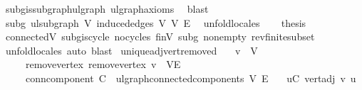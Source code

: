 \begin{isabellebody}
\ subg{\isachardot}{\kern0pt}is{\isacharunderscore}{\kern0pt}subgraph{\isacharunderscore}{\kern0pt}ulgraph\ ulgraph{\isacharunderscore}{\kern0pt}axioms\ \isamarkupfalse%
\ blast\isanewline
\ \ \isamarkupfalse%
\ subg{\isacharcolon}{\kern0pt}\ ulsubgraph\ V{\isacharprime}{\kern0pt}\ {\isachardoublequoteopen}induced{\isacharunderscore}{\kern0pt}edges\ V{\isacharprime}{\kern0pt}{\isachardoublequoteclose}\ V\ E\ \isamarkupfalse%
\ unfold{\isacharunderscore}{\kern0pt}locales\isanewline
\ \ \isamarkupfalse%
\ {\isacharquery}{\kern0pt}thesis\ \isamarkupfalse%
\ connected{\isacharunderscore}{\kern0pt}V{\isacharprime}{\kern0pt}\ subg{\isachardot}{\kern0pt}is{\isacharunderscore}{\kern0pt}cycle{}\ no{\isacharunderscore}{\kern0pt}cycles\ finV\ subg\ non{\isacharunderscore}{\kern0pt}empty\ rev{\isacharunderscore}{\kern0pt}finite{\isacharunderscore}{\kern0pt}subset\ \isamarkupfalse%
\ {\isacharparenleft}{\kern0pt}unfold{\isacharunderscore}{\kern0pt}locales{\isacharparenright}{\kern0pt}\ {\isacharparenleft}{\kern0pt}auto{\isacharcomma}{\kern0pt}\ blast{\isacharparenright}{\kern0pt}\isanewline
{}\isamarkupfalse%
%
\endisatagproof
{\isafoldproof}%
%
\isadelimproof
\isanewline
%
\endisadelimproof
\isanewline
{}\isamarkupfalse%
\ unique{\isacharunderscore}{\kern0pt}adj{\isacharunderscore}{\kern0pt}vert{\isacharunderscore}{\kern0pt}removed{\isacharcolon}{\kern0pt}\isanewline
\ \ \ {\isachardoublequoteopen}v\ {\isasymin}\ V{\isachardoublequoteclose}\isanewline
\ \ \ \ \ remove{\isacharunderscore}{\kern0pt}vertex{\isacharcolon}{\kern0pt}\ {\isachardoublequoteopen}remove{\isacharunderscore}{\kern0pt}vertex\ v\ {\isacharequal}{\kern0pt}\ {\isacharparenleft}{\kern0pt}V{\isacharprime}{\kern0pt}{\isacharcomma}{\kern0pt}E{\isacharprime}{\kern0pt}{\isacharparenright}{\kern0pt}{\isachardoublequoteclose}\isanewline
\ \ \ \ \ conn{\isacharunderscore}{\kern0pt}component{\isacharcolon}{\kern0pt}\ {\isachardoublequoteopen}C\ {\isasymin}\ ulgraph{\isachardot}{\kern0pt}connected{\isacharunderscore}{\kern0pt}components\ V{\isacharprime}{\kern0pt}\ E{\isacharprime}{\kern0pt}{\isachardoublequoteclose}\isanewline
\ \ \ {\isachardoublequoteopen}{\isasymexists}{\isacharbang}{\kern0pt}u{\isasymin}C{\isachardot}{\kern0pt}\ vert{\isacharunderscore}{\kern0pt}adj\ v\ u{\isachardoublequoteclose}\isanewline
%
\isadelimproof
%
\endisadelimproof
%
\isatagproof
{}\isamarkupfalse%

\end{isabellebody}

